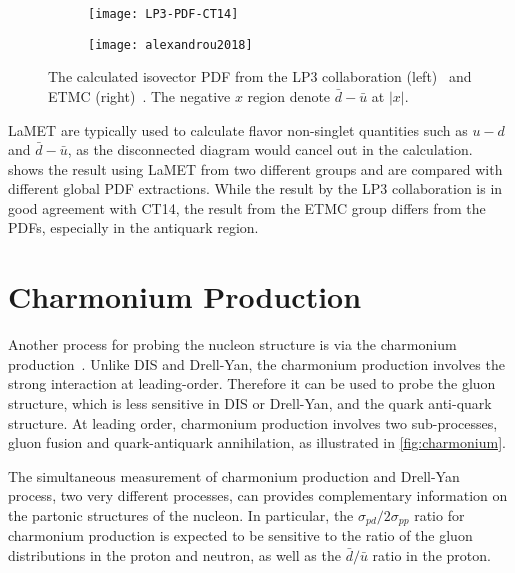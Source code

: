 \documentclass[../main.tex]{subfiles}
\begin{document}
\begin{figure}[h!]
	\centering
	\begin{subfigure}{0.45\linewidth}
		\texttt{[image: LP3-PDF-CT14]}
	\end{subfigure}
	\begin{subfigure}{0.45\linewidth}
		\texttt{[image: alexandrou2018]}
	\end{subfigure}
	\caption{The calculated isovector PDF from the LP3 collaboration (left)~\cite{chen2018}
		and ETMC (right)~\cite{alexandrou2018}.
		The negative $x$ region denote $\bar{d}-\bar{u}$ at $\left|x\right|$.}
	\label{fig:lamet}
\end{figure}
LaMET are typically used to calculate flavor non-singlet quantities such as $u-d$ and $\bar{d}-\bar{u}$,
as the disconnected diagram would cancel out in the calculation.
 shows the result using LaMET from two different groups and are compared with
different global PDF extractions. While the result by the LP3 collaboration
is in good agreement with CT14, the result from the ETMC group differs from the PDFs,
especially in the antiquark region.

\chapter{Charmonium Production}
\label{ch:jpsi}
Another process for probing the nucleon structure is via the charmonium production~\cite{peng1995,chang2020}.
Unlike DIS and Drell-Yan, the charmonium production involves the strong interaction
at leading-order. Therefore it can be used to probe the gluon structure, which is
less sensitive in DIS or Drell-Yan, and the quark anti-quark structure. 
At leading order, charmonium production involves two sub-processes, gluon fusion and 
quark-antiquark annihilation, as illustrated in \cref{fig:charmonium}.

The simultaneous measurement of charmonium production and Drell-Yan process, two very different
processes, can provides complementary information on the partonic structures of the nucleon. 
In particular, the $\sigma_{pd}/2\sigma_{pp}$ ratio for charmonium 
production is expected to be sensitive to the ratio of the gluon distributions in the proton 
and neutron, as well as the $\bar{d}/\bar{u}$ ratio in the proton.
\end{document}
